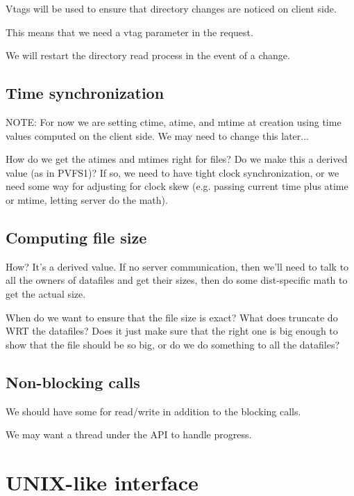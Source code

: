 \documentclass[10pt]{article} %
\begin{document}
Vtags will be used to ensure that directory changes are noticed on client
side.

This means that we need a vtag parameter in the request.

We will restart the directory read process in the event of a change.

\subsection{Time synchronization}

NOTE: For now we are setting ctime, atime, and mtime at creation using
time values computed on the client side.  We may need to change this
later...

How do we get the atimes and mtimes right for files?  Do we make this a
derived value (as in PVFS1)?  If so, we need to have tight clock
synchronization, or we need some way for adjusting for clock skew
(e.g. passing current time plus atime or mtime, letting server do the math).

\subsection{Computing file size}

How?  It's a derived value.  If no server communication, then we'll need to
talk to all the owners of datafiles and get their sizes, then do some
dist-specific math to get the actual size.

When do we want to ensure that the file size is exact?  What does truncate do
WRT the datafiles?  Does it just make sure that the right one is big enough to
show that the file should be so big, or do we do something to all the datafiles?

%
%
\subsection{Non-blocking calls}

We should have some for read/write in addition to the blocking calls.

We may want a thread under the API to handle progress.




%
%
\section{UNIX-like interface}
\end{document}
